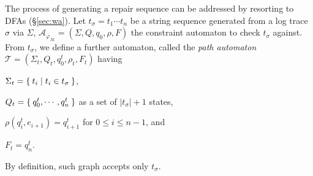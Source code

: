 %

The process of generating a repair sequence can be addressed by resorting to DFAs (\S\ref{sec:wa}). Let $t_\sigma=t_1\cdots t_n$ be a string sequence generated from a log trace $\sigma$ via $\Sigma$, $\mathcal{A}_{\varphi_{\mathcal{M}}}=(\Sigma,Q,q_0,\rho,F)$ the constraint automaton to check $t_\sigma$ against. From $t_\sigma$, we define a further automaton, called the \textit{path automaton} $\mathcal{T}=(\Sigma_t,Q_t,q_0^t,\rho_t,F_t)$ having \begin{enumerate*}[label=\emph{\alph*})]
	\item $\Sigma_t=\Set{t_i|t_i\in t_\sigma}$,
	\item $Q_t=\Set{q_0^t,\cdots,q_n^t}$ as a set of $|t_\sigma|+1$ states,
	\item $\rho(q_i^t,e_{i+1})=q_{i+1}^t$ for $0\leq i\leq n-1$,
	and 
	\item $F_t={q_n^t}$.
\end{enumerate*} By definition, such graph accepts only $t_\sigma$. 

